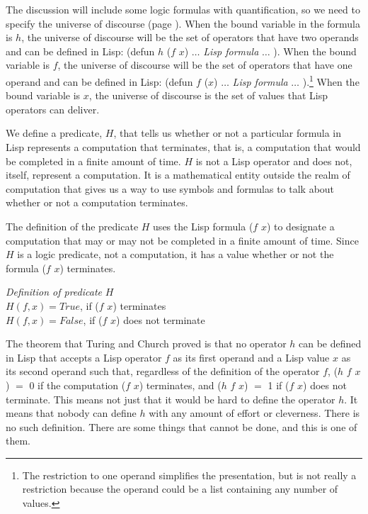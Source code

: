 The discussion will include some logic formulas with
quantification,
so we need to specify the universe of discourse
(page \pageref{def-universe-of-discourse}).
When the bound variable
in the formula is $h$, the universe of discourse
will be the set of operators that have
two operands and can be defined in Lisp:
\textsf{(defun $h$ ($f$ $x$)} $\dots$ \emph{Lisp formula} $\dots$ \textsf{)}.
When the bound variable is $f$,
the universe of discourse will be the set of operators
that have one operand and can be defined in Lisp:
\textsf{(defun $f$ ($x$)} $\dots$ \emph{Lisp formula} $\dots$ \textsf{)}.\footnote{The
restriction to one operand simplifies the presentation,
but is not really a restriction because the operand could
be a list containing any number of values.}
When the bound variable is $x$, the universe of discourse
is the set of values that Lisp operators can deliver.

We define a predicate, $H$, that tells us whether or not
a particular formula in Lisp represents a computation that terminates,
that is, a computation that would be completed in a finite amount of time.
$H$ is not a Lisp operator and does not, itself,
represent a computation. It is a mathematical entity
outside the realm of computation that gives us a way
to use symbols and formulas to talk about
whether or not a computation terminates.

The definition of the predicate $H$ uses the Lisp
formula \textsf{($f$ $x$)} to designate a computation that may
or may not be completed in a finite amount of time.
Since $H$ is a logic predicate, not a computation,
it has a value whether or not the formula \textsf{($f$ $x$)} terminates.

\label{def:predicate-H}
\hspace*{5mm}\emph{Definition of predicate} $H$\\
\hspace*{10mm}$H(f, x) = True$, if \textsf{($f$ $x$)} terminates\\
\hspace*{10mm}$H(f, x) = False$, if \textsf{($f$ $x$)} does not terminate

The theorem that Turing and Church proved is that
no operator $h$ can be defined in Lisp
that accepts a Lisp operator $f$ as its
first operand and a Lisp value $x$ as its second operand
such that, regardless of the definition of the operator $f$,
\textsf{($h$ $f$ $x$)} $=$ 0 if the computation \textsf{($f$ $x$)} terminates, and
\textsf{($h$ $f$ $x$)} $=$ 1 if \textsf{($f$ $x$)} does not terminate.
This means not just that it would be hard to define the operator $h$.
It means that nobody can define $h$ with any amount of effort or cleverness.
There is no such definition.
There are some things that cannot be done, and this is one of them.


